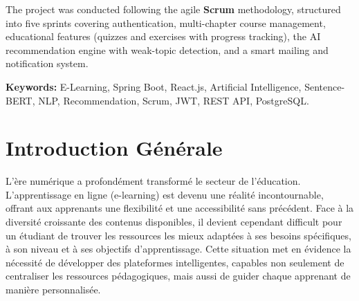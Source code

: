 \documentclass[12pt,a4paper]{report}
\begin{document}
The project was conducted following the agile \textbf{Scrum} methodology, structured into five sprints covering authentication, multi-chapter course management, educational features (quizzes and exercises with progress tracking), the AI recommendation engine with weak-topic detection, and a smart mailing and notification system.

\textbf{Keywords:} E-Learning, Spring Boot, React.js, Artificial Intelligence, Sentence-BERT, NLP, Recommendation, Scrum, JWT, REST API, PostgreSQL.

\newpage

\tableofcontents
\newpage

\begingroup
\let\clearpage\relax
\listoffigures
\vspace{1cm}
\listoftables
\endgroup

\newpage
{}

\chapter*{Introduction Générale}

L'ère numérique a profondément transformé le secteur de l'éducation. L'apprentissage en ligne (e-learning) est devenu une réalité incontournable, offrant aux apprenants une flexibilité et une accessibilité sans précédent. Face à la diversité croissante des contenus disponibles, il devient cependant difficult pour un étudiant de trouver les ressources les mieux adaptées à ses besoins spécifiques, à son niveau et à ses objectifs d'apprentissage. Cette situation met en évidence la nécessité de développer des plateformes intelligentes, capables non seulement de centraliser les ressources pédagogiques, mais aussi de guider chaque apprenant de manière personnalisée.
\end{document}
